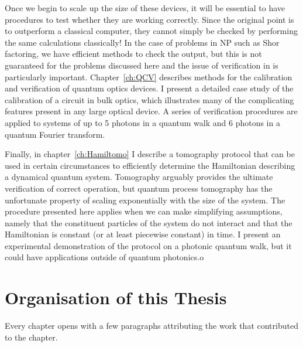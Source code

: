Once we begin to scale up the size of these devices, it will be essential to
have procedures to test whether they are working correctly. Since the original
point is to outperform a classical computer, they cannot simply be checked by
performing the same calculations classically! In the case of problems in NP such
as Shor factoring, we have efficient methods to check the output, but this is
not guaranteed for the problems discussed here and the issue of verification in
\bosonsampling is particularly important. Chapter~\ref{ch:QCV} describes methods
for the calibration and verification of quantum optics devices. I present a
detailed case study of the calibration of a circuit in bulk optics, which
illustrates many of the complicating features present in any large optical
device. A series of verification procedures are applied to systems of up to 5
photons in a quantum walk and 6 photons in a quantum Fourier transform.

Finally, in chapter~\ref{ch:Hamiltomo} I describe a tomography protocol that can
be used in certain circumstances to efficiently determine the Hamiltonian
describing a dynamical quantum system. Tomography arguably provides the ultimate
verification of correct operation, but quantum process tomography has the
unfortunate property of scaling exponentially with the size of the system. The
procedure presented here applies when we can make simplifying assumptions,
namely that the constituent particles of the system do not interact and that the
Hamiltonian is constant (or at least piecewise constant) in time. I present an
experimental demonstration of the protocol on a photonic quantum walk, but it
could have applications outside of quantum photonics.o

\section{Organisation of this Thesis}
\label{sec:Organisation}
Every chapter opens with a few paragraphs attributing the work that contributed
to the chapter. 

